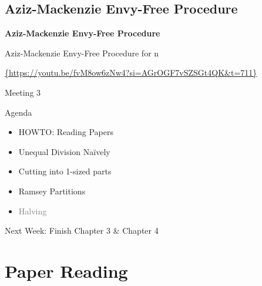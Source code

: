 \documentclass[aspectratio=169,xcolor=dvipsnames]{beamer}
\begin{document}
\subsection{Aziz-Mackenzie Envy-Free Procedure}
\begin{frame}
	\Huge{\centerline{\textbf{Aziz-Mackenzie Envy-Free Procedure}}}
\end{frame}
\begin{frame}{Aziz-Mackenzie Envy-Free Procedure for n}
	\centerline{\url{{https://youtu.be/fvM8ow6zNw4?si=AGrOGF7vSZSGt4QK&t=711}}}
\end{frame}
\begin{frame}{Meeting 3}
	\begin{block}{Agenda}
		\begin{itemize}
			\item HOWTO: Reading Papers
			\item Unequal Division Na{\"i}vely
			\item Cutting into 1-sized parts
			\item Ramsey Partitions
			\item \textcolor{Gray}{Halving}
		\end{itemize}
	\end{block}
	Next Week: Finish Chapter 3 \& Chapter 4
\end{frame}
\section{Paper Reading}
\end{document}
